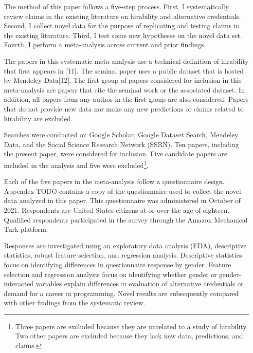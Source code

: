 \documentclass[review]{elsarticle}
\begin{document}
The method of this paper follows a five-step process.
First, I systematically review claims in the existing literature on hirability and alternative credentials.
Second, I collect novel data for the purpose of replicating and testing claims in the existing literature.
Third, I test some new hypotheses on the novel data set.
Fourth, I perform a meta-analysis across current and prior findings.

The papers in this systematic meta-analysis use a technical definition of hirability that first appears in [11].
The seminal paper uses a public dataset that is hosted by Mendeley Data[12].
The first group of papers considered for inclusion in this meta-analysis are
papers that cite the seminal work or the associated dataset.
In addition, all papers from any author in the first group are also considered.
Papers that do not provide new data nor make any new predictions or claims related to hirability are excluded.

Searches were conducted on Google Scholar, Google Dataset Search, Mendeley Data, and the Social Science Research Network (SSRN).
Ten papers, including the present paper, were considered for inclusion.
Five candidate papers are included in the analysis and five were excluded\footnote{
    Three papers are excluded because they are unrelated to a study of hirability.
    Two other papers are excluded because they lack new data, predictions, and claims.
}.

Each of the five papers in the meta-analysis follow a questionnaire design.
Appendex TODO contains a copy of the questionnaire used to collect the novel data analyzed in this paper.
This questionnaire was administered in October of 2021.
Respondents are United States citizens at or over the age of eighteen.
Qualified respondents participated in the survey through the Amazon Mechanical Turk platform.

Responses are investigated using an exploratory data analysis (EDA),
descriptive statistics,
robust feature selection,
and regression analysis.
Descriptive statistics focus on identifying differences in questionnaire response by gender.
Feature selection and regression analysis focus on identifying whether gender or gender-interacted variables
explain differences in evaluation of alternative credentials or demand for a career in programming.
Novel results are subsequently compared with other findings from the systematic review.
\end{document}
